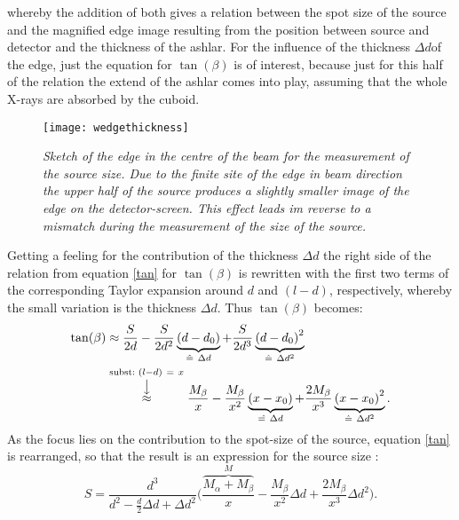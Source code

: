 whereby the addition of both gives a relation between the spot size of the source and the magnified edge image resulting from the position between source and detector and the thickness of the ashlar. For the influence of the thickness $\Delta d$of the edge, just the equation for $\tan(\beta)$ is of interest, because just for this half of the relation the extend of the ashlar comes into play, assuming that the whole X-rays are absorbed by the cuboid. \begin{figure}[h]
	\begin{center}
		\texttt{[image: wedgethickness]}
	\end{center}
	\caption[Drawing of the edge in the centre of the beam for the measurement of the source size]{\textit{Sketch of the edge in the centre of the beam for the measurement of the source size. Due to the finite site of the edge in beam direction the upper half of the source produces a slightly smaller image of the edge on the detector-screen. This effect leads im reverse to a mismatch during the measurement of the size of the source.}}
	\label{knife}
\end{figure}
Getting a feeling for the contribution of the thickness $\Delta d$ the right side of the relation from equation \ref{tan} for $\tan(\beta)$ is rewritten with the first two terms of the corresponding Taylor expansion around $d$ and $(l-d)$, respectively, whereby the small variation is the thickness $\Delta d$. Thus $\tan(\beta)$ becomes:
\begin{equation}\label{taylor}
\begin{aligned}
\tan(\beta) &\approx \frac{S}{2d} -\frac{S}{2d^{2}} \underbrace{\left(d-d_{0}\right)}_{\hat{=}\ \Delta d} + \frac{S}{2d^{3}} \underbrace{\left(d - d_{0}\right)^{2}}_{\hat{=}\ \Delta d^{2}} \\  
&\stackrel{{\text{subst:\ } (l-d)\  =\  x}}{\stackrel{\big\downarrow}{\approx}} \frac{M_{\beta}}{x} - 
\frac{M_{\beta}}{x^{2}} \underbrace{\left(x -x_{0}\right)}_{\hat{=\ }\Delta d} + 
\frac{2 M_{\beta}}{x^{3}} \underbrace{\left(x - x_{0}\right)^{2}}_{\hat{=}\ \Delta d^{2}}.
\end{aligned}
\end{equation}
As the focus lies on the contribution to the spot-size of the source, equation \ref{tan} is rearranged, so that the result is an expression for the source size :
\begin{equation}
S = \frac{d^{3}}{d^{2}-\frac{d}{2} \Delta d + \Delta d^{2}}
\bigg(\frac{\overbrace{M_{\alpha}+M_{\beta}}^{M}}{x}
-\frac{M_{\beta}}{x^{2}} \Delta d 
+ \frac{2 M_{\beta}}{x^{3}} \Delta d^{2}\bigg).
\end{equation}
